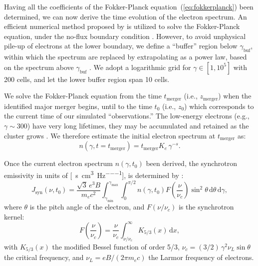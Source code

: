 \documentclass[modern]{aastex61}
\newcommand{\R}[1]{\mathrm{#1}}
\newcommand{\D}[1]{\R{d} #1}
\begin{document}
Having all the coefficients of the Fokker-Planck
equation~(\ref{eq:fokkerplanck}) been determined, we can now derive
the time evolution of the electron spectrum.
An efficient numerical method proposed by \citet{chang1970} is
utilized to solve the Fokker-Planck equation, under the no-flux boundary
condition \citep{park1996}.
However, to avoid unphysical pile-up of electrons at the lower boundary,
we define a \enquote{buffer} region below $\gamma_{\R{buf}}$, within which
the spectrum are replaced by extrapolating as a power law, based on
the spectrum above $\gamma_{\R{buf}}$ \citep{donnert2014}.
We adopt a logarithmic grid for $\gamma \in [1, 10^5]$ with 200 cells,
and let the lower buffer region span 10 cells.

We solve the Fokker-Planck equation from the time $t_{\R{merger}}$
(i.e., $z_{\R{merger}}$) when the identified major merger begins,
until to the time $t_0$ (i.e., $z_0$) which corresponds to the current
time of our simulated \enquote{observations.}
The low-energy electrons (e.g., $\gamma \sim 300$) have very long
lifetimes, they may be accumulated and retained as the cluster
grows \citep{sarazin1999}.
We therefore estimate the initial electron spectrum at $t_{\R{merger}}$ as:
\begin{equation}
  \label{eq:ne-init}
  n(\gamma, t=t_{\R{merger}}) = t_{\R{merger}} K_e \,\gamma^{-s}.
\end{equation}

Once the current electron spectrum $n(\gamma, t_0)$ been derived,
the synchrotron emissivity in units of
[\si{\erg\per\second\per\cm\cubed\per\hertz}],
is determined by \citep{rybicki1979}:
\begin{equation}
  \label{sec:jnu-sync}
  J_{\R{syn}}(\nu, t_0) = \frac{\sqrt{3} \, e^3 B}{m_e c^2}
  \int_{\gamma_{\R{min}}}^{\gamma_{\R{max}}} \!\!\int_0^{\pi/2}
  n(\gamma, t_0) F\!\left( \frac{\nu}{\nu_c} \right) \sin^2 \!\theta
  \,\D{\theta} \,\D{\gamma},
\end{equation}
where $\theta$ is the pitch angle of the electron,
and $F(\nu/\nu_c)$ is the synchrotron kernel:
\begin{equation}
  \label{eq:sync-kernel}
  F\!\left( \frac{\nu}{\nu_c} \right) = \frac{\nu}{\nu_c}
  \int_{\nu/\nu_c}^{\infty} K_{5/3}(x) \,\D{x},
\end{equation}
with $K_{5/3}(x)$ the modified Bessel function of order 5/3,
$\nu_c = (3/2) \,\gamma^2 \nu_L \sin\theta$ the critical frequency,
and $\nu_L = e B / (2\pi m_e c)$ the Larmor frequency of electrons.
\end{document}
